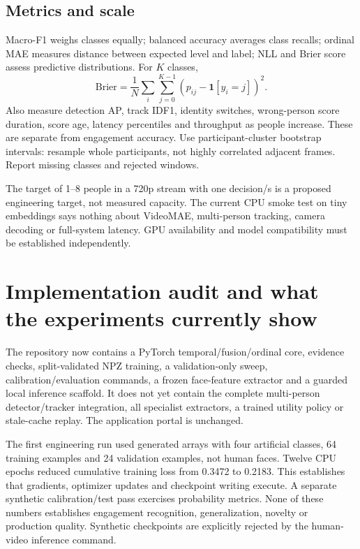 \documentclass[10pt,a4paper]{article}
\newcommand{\ind}{\mathbf{1}}
\begin{document}
\subsection{Metrics and scale}
Macro-F1 weighs classes equally; balanced accuracy averages class recalls; ordinal MAE measures distance between expected level and label; NLL and Brier score assess predictive distributions. For $K$ classes,
\begin{equation}
\mathrm{Brier}=\frac1N\sum_i\sum_{j=0}^{K-1}(p_{ij}-\ind[y_i=j])^2.
\end{equation}
Also measure detection AP, track IDF1, identity switches, wrong-person score duration, score age, latency percentiles and throughput as people increase. These are separate from engagement accuracy. Use participant-cluster bootstrap intervals: resample whole participants, not highly correlated adjacent frames. Report missing classes and rejected windows.

The target of 1--8 people in a 720p stream with one decision/s is a proposed engineering target, not measured capacity. The current CPU smoke test on tiny embeddings says nothing about VideoMAE, multi-person tracking, camera decoding or full-system latency. GPU availability and model compatibility must be established independently.

\section{Implementation audit and what the experiments currently show}
The repository now contains a PyTorch temporal/fusion/ordinal core, evidence checks, split-validated NPZ training, a validation-only sweep, calibration/evaluation commands, a frozen face-feature extractor and a guarded local inference scaffold. It does not yet contain the complete multi-person detector/tracker integration, all specialist extractors, a trained utility policy or stale-cache replay. The application portal is unchanged.

The first engineering run used generated arrays with four artificial classes, 64 training examples and 24 validation examples, not human faces. Twelve CPU epochs reduced cumulative training loss from 0.3472 to 0.2183. This establishes that gradients, optimizer updates and checkpoint writing execute. A separate synthetic calibration/test pass exercises probability metrics. None of these numbers establishes engagement recognition, generalization, novelty or production quality. Synthetic checkpoints are explicitly rejected by the human-video inference command.
\end{document}
